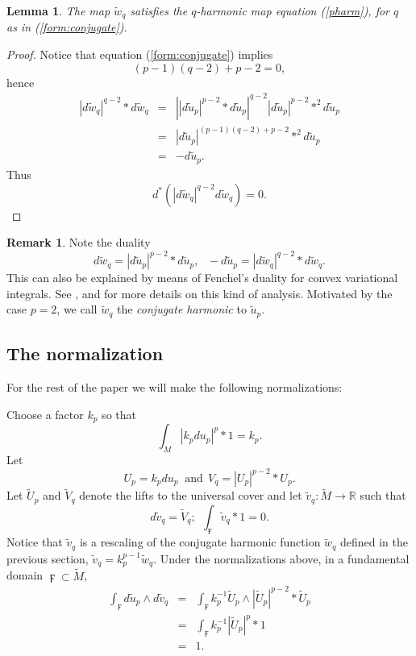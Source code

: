 \documentclass{ip-journal}
\newtheorem{lemma}[theorem]{Lemma}
\theoremstyle{definition}
\newtheorem{remark}[theorem]{Remark}
\numberwithin{equation}{section}
\newcommand{\R}{\mathbb R}
\begin{document}
\begin{lemma}\label{conjugate} The map $\tilde w_q$  satisfies the $q$-harmonic map equation (\ref{pharm}), for $q$ as in (\ref{form:conjugate}).
\end{lemma}
\begin{proof} 
Notice that  equation (\ref{form:conjugate}) implies
\[
(p-1)(q-2)+p-2=0,
\]
hence
\begin{eqnarray*}
|d\tilde w_q|^{q-2}*d\tilde w_q &=&
 \left| |d\tilde u_p|^{p-2}*d\tilde u_p \right|^{q-2}|d\tilde u_p|^{p-2}*^2d\tilde u_p  \\
&=&  |d\tilde u_p|^{(p-1)(q-2)+p-2} *^2 d\tilde u_p  \\
&=&   -d\tilde u_p.  
\end{eqnarray*}
Thus
\[
d^*(|d\tilde w_q|^{q-2}d\tilde w_q)=0. 
\]
 \end{proof}
 
 \begin{remark}\label{dual-eqn}  Note the duality
\[
 d\tilde w_q=|d\tilde u_p|^{p-2}*d\tilde u_p, \ \ \ -d\tilde u_p=|d\tilde w_q|^{q-2}*d\tilde w_q.
\]
 This can also be explained by means of Fenchel's duality for convex variational integrals. See \cite{fenchel}, \cite{temam} and \cite{aronsonlin} for more details on this kind of analysis.
 Motivated by the case $p=2$, we call $\tilde w_q$ the {\it conjugate harmonic} to $\tilde u_p$. 
 \end{remark}
 

 
 \subsection{The normalization} For the rest of the paper we will make the following normalizations:
 
Choose a factor $k_p$ so that
\begin{equation}\label{normintv1}
  \int_M  | k_p d u_p|^p*1 =   k_p.
\end{equation}
Let 
\begin{equation}\label{normintv2}
 U_p = k_p d  u_p  \ \mbox{ and} \ \    V_q = |  U_p|^{p-2}*  U_p.
\end{equation}
 Let $\tilde U_p$ and $\tilde V_q$ denote the lifts to the universal cover and let $\tilde v_q: \tilde M \rightarrow \R$
such that
\begin{equation}\label{normintv3}
 d\tilde v_q=\tilde V_q; \ \ \int_\digamma\tilde v_q *1=0.
 \end{equation}
Notice that $\tilde v_q$ is a rescaling of the conjugate harmonic function $\tilde w_q$ defined in the previous section, $\tilde v_q=k_p^{p-1} \tilde w_q$.
Under the normalizations above, in a fundamental domain $\digamma \subset \tilde M$,
\begin{eqnarray} \label{kappavolform0}
\int_\digamma d\tilde u_p \wedge d \tilde v_q 
&=&
\int_\digamma k_p^{-1} \tilde U_p \wedge | \tilde U_p|^{p-2}* \tilde U_p \nonumber\\
&=&\int_\digamma k_p^{-1} | \tilde U_p|^p *1\\
  &=&1\nonumber.
\end{eqnarray}
\end{document}
